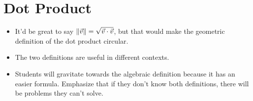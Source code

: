 \documentclass{workbook}
\newcommand{\bookonlynewpage}{\begin{bookonly}\newpage\end{bookonly}}
\begin{document}
\begin{slide}[+1]
	\bookonlynewpage
\section*{Dot Product}
	\begin{annotation}
		\begin{notes}
			\begin{itemize}
				\item It'd be great to say $\lVert\vec v\rVert=\sqrt{\vec v\cdot \vec v}$,
					but that would make the geometric definition of the dot product circular.
			\end{itemize}
		\end{notes}
	\end{annotation}

	\SavedDefinitionRender{Norm}

	\begin{annotation}
		\begin{notes}
			\begin{itemize}
				\item The two definitions are useful in different contexts.
				\item Students will gravitate towards the algebraic definition because
					it has an easier formula. Emphasize that if they don't know
					both definitions, there will be problems they can't solve.
			\end{itemize}
		\end{notes}
	\end{annotation}

\end{slide}
\end{document}
